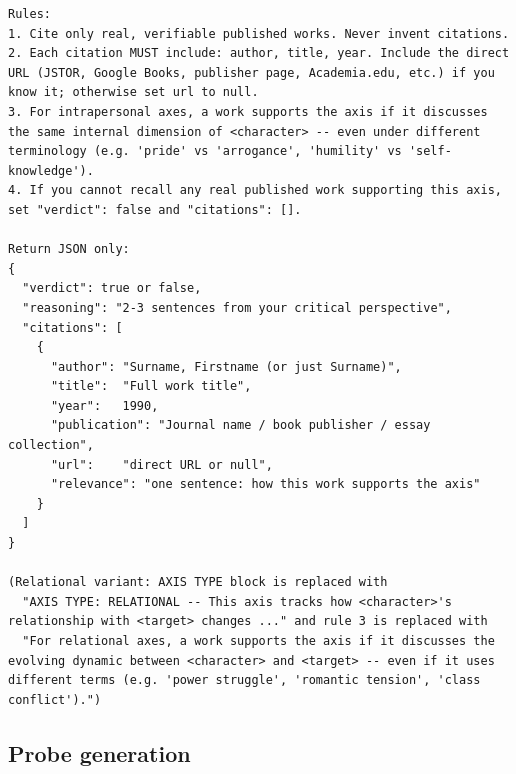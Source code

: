 \documentclass{llmxive}
\begin{document}
\begin{table}[htbp]
\begin{lstlisting}[basicstyle=\ttfamily\scriptsize]
Rules:
1. Cite only real, verifiable published works. Never invent citations.
2. Each citation MUST include: author, title, year. Include the direct URL (JSTOR, Google Books, publisher page, Academia.edu, etc.) if you know it; otherwise set url to null.
3. For intrapersonal axes, a work supports the axis if it discusses the same internal dimension of <character> -- even under different terminology (e.g. 'pride' vs 'arrogance', 'humility' vs 'self-knowledge').
4. If you cannot recall any real published work supporting this axis, set "verdict": false and "citations": [].

Return JSON only:
{
  "verdict": true or false,
  "reasoning": "2-3 sentences from your critical perspective",
  "citations": [
    {
      "author": "Surname, Firstname (or just Surname)",
      "title":  "Full work title",
      "year":   1990,
      "publication": "Journal name / book publisher / essay collection",
      "url":    "direct URL or null",
      "relevance": "one sentence: how this work supports the axis"
    }
  ]
}

(Relational variant: AXIS TYPE block is replaced with
  "AXIS TYPE: RELATIONAL -- This axis tracks how <character>'s relationship with <target> changes ..." and rule 3 is replaced with
  "For relational axes, a work supports the axis if it discusses the evolving dynamic between <character> and <target> -- even if it uses different terms (e.g. 'power struggle', 'romantic tension', 'class conflict').")
\end{lstlisting}
\caption{Stage~iii LLM-critic prompt. Three critic systems are shown; each is paired with the same user message (intrapersonal variant; the relational variant swaps the \texttt{AXIS TYPE} block).}
\label{tab:prompt-llm-critic}
\end{table}


\subsection{Probe generation}
\end{document}
